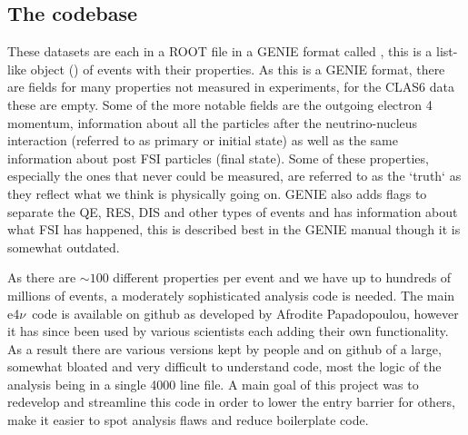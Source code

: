\documentclass[a4paper,12pt]{article}
\newcommand{\efn}{e4$\nu$}
\newcommand{\verbb}[1]{\text{\Verb|#1|}}
\begin{document}
\subsection{The codebase}
These datasets are each in a ROOT file in a GENIE format called \verbb{gst}, this is a list-like object (\verbb{TTree}) of events with their properties.
As this is a GENIE format, there are fields for many properties not measured in experiments, for the CLAS6 data these are empty.
Some of the more notable fields are the outgoing electron 4 momentum, information about all the particles after the neutrino-nucleus interaction (referred to as primary or initial state) as well as the same information about post FSI particles (final state).
Some of these properties, especially the ones that never could be measured, are referred to as the `truth` as they reflect what we think is physically going on.
GENIE also adds flags to separate the QE, RES, DIS and other types of events and has information about what FSI has happened, this is described best in the GENIE manual\cite{andreopoulosGENIENeutrinoMonte2015} though it is somewhat outdated.

As there are $\sim100$ different properties per event and we have up to hundreds of millions of events, a moderately sophisticated analysis code is needed.
The main \efn\ code is available on github \cite{E4nuE4nuanalysiscodePlaceholder} as developed by Afrodite Papadopoulou, however it has since been used by various scientists each adding their own functionality.
As a result there are various versions kept by people and on github of a large, somewhat bloated and very difficult to understand code, most the logic of the analysis being in a single 4000 line file.
A main goal of this project was to redevelop and streamline this code in order to lower the entry barrier for others, make it easier to spot analysis flaws and reduce boilerplate code.
\end{document}
